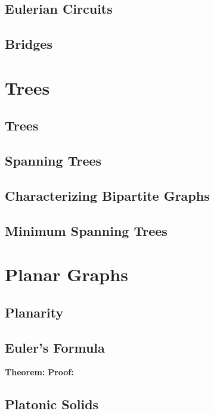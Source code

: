 \documentclass{book}
\theoremstyle{nonumberplain}
\begin{document}
\section{Eulerian Circuits}
\section{Bridges}
\chapter{Trees}
\section{Trees}
\section{Spanning Trees}
\section{Characterizing Bipartite Graphs}
\section{Minimum Spanning Trees} 
\chapter{Planar Graphs}
\section{Planarity}
\section{Euler's Formula}
\textbf{Theorem: }
\textbf{Proof: }
\section{Platonic Solids}
\end{document}
